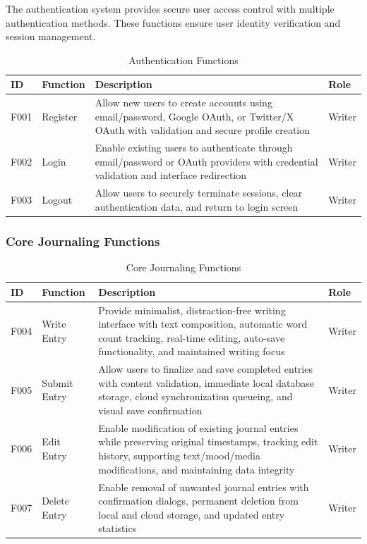 The authentication system provides secure user access control with multiple authentication methods. These functions ensure user identity verification and session management.

\begin{table}[H]
\centering
\caption{Authentication Functions}
\label{tab:auth-functions}
\begin{tabular}{|p{0.8cm}|p{2.2cm}|p{9.5cm}|p{1.5cm}|}
\hline
\textbf{ID} & \textbf{Function} & \textbf{Description} & \textbf{Role} \\
\hline
F001 & Register & Allow new users to create accounts using email/password, Google OAuth, or Twitter/X OAuth with validation and secure profile creation & Writer \\
\hline
F002 & Login & Enable existing users to authenticate through email/password or OAuth providers with credential validation and interface redirection & Writer \\
\hline
F003 & Logout & Allow users to securely terminate sessions, clear authentication data, and return to login screen & Writer \\
\hline
\end{tabular}
\end{table}

\subsubsection{Core Journaling Functions}

\begin{table}[H]
\centering
\caption{Core Journaling Functions}
\label{tab:core-journaling-functions}
\begin{tabular}{|p{0.8cm}|p{2.2cm}|p{9.5cm}|p{1.5cm}|}
\hline
\textbf{ID} & \textbf{Function} & \textbf{Description} & \textbf{Role} \\
\hline
F004 & Write Entry & Provide minimalist, distraction-free writing interface with text composition, automatic word count tracking, real-time editing, auto-save functionality, and maintained writing focus & Writer \\
\hline
F005 & Submit Entry & Allow users to finalize and save completed entries with content validation, immediate local database storage, cloud synchronization queueing, and visual save confirmation & Writer \\
\hline
F006 & Edit Entry & Enable modification of existing journal entries while preserving original timestamps, tracking edit history, supporting text/mood/media modifications, and maintaining data integrity & Writer \\
\hline
F007 & Delete Entry & Enable removal of unwanted journal entries with confirmation dialogs, permanent deletion from local and cloud storage, and updated entry statistics & Writer \\
\hline
\end{tabular}
\end{table}


